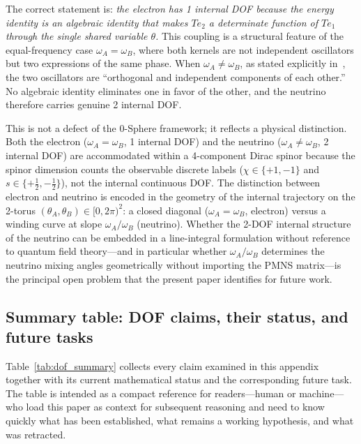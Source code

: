 \documentclass[%
 reprint, amsmath,amssymb, aps, prb, ]{revtex4-2}
\numberwithin{equation}{section}
\begin{document}
The correct statement is: \emph{the electron has 1 internal DOF because the energy identity is an algebraic identity that makes $Te_2$ a determinate function of $Te_1$ through the single shared variable $\theta$.} This coupling is a structural feature of the equal-frequency case $\omega_A = \omega_B$, where both kernels are not independent oscillators but two expressions of the same phase. When $\omega_A \neq \omega_B$, as stated explicitly in~\cite{hanamura09}, the two oscillators are ``orthogonal and independent components of each other.'' No algebraic identity eliminates one in favor of the other, and the neutrino therefore carries genuine 2 internal DOF.

This is not a defect of the 0-Sphere framework; it reflects a physical distinction. Both the electron ($\omega_A = \omega_B$, 1 internal DOF) and the neutrino ($\omega_A \neq \omega_B$, 2 internal DOF) are accommodated within a 4-component Dirac spinor because the spinor dimension counts the observable discrete labels ($\chi \in \{+1,-1\}$ and $s \in \{+\tfrac{1}{2},-\tfrac{1}{2}\}$), not the internal continuous DOF. The distinction between electron and neutrino is encoded in the geometry of the internal trajectory on the 2-torus $(\theta_A,\theta_B)\in[0,2\pi)^2$: a closed diagonal ($\omega_A=\omega_B$, electron) versus a winding curve at slope $\omega_A/\omega_B$ (neutrino). Whether the 2-DOF internal structure of the neutrino can be embedded in a line-integral formulation without reference to quantum field theory---and in particular whether $\omega_A/\omega_B$ determines the neutrino mixing angles geometrically without importing the PMNS matrix---is the principal open problem that the present paper identifies for future work.

\subsection{Summary table: DOF claims, their status, and future tasks}
\label{app:reasoning_summary}

Table~\ref{tab:dof_summary} collects every claim examined in this appendix together with its current mathematical status and the corresponding future task. The table is intended as a compact reference for readers---human or machine---who load this paper as context for subsequent reasoning and need to know quickly what has been established, what remains a working hypothesis, and what was retracted.
\end{document}
